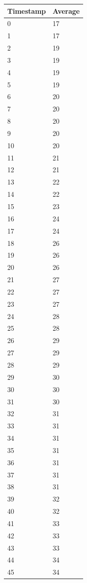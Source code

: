\begin{tabular}{|l||l|}
\hline
	\textbf{Timestamp} & \textbf{Average} \\ \hline
	0 & 17 \\ \hline
	1 & 17 \\ \hline
	2 & 19 \\ \hline
	3 & 19 \\ \hline
	4 & 19 \\ \hline
	5 & 19 \\ \hline
	6 & 20 \\ \hline
	7 & 20 \\ \hline
	8 & 20 \\ \hline
	9 & 20 \\ \hline
	10 & 20 \\ \hline
	11 & 21 \\ \hline
	12 & 21 \\ \hline
	13 & 22 \\ \hline
	14 & 22 \\ \hline
	15 & 23 \\ \hline
	16 & 24 \\ \hline
	17 & 24 \\ \hline
	18 & 26 \\ \hline
	19 & 26 \\ \hline
	20 & 26 \\ \hline
	21 & 27 \\ \hline
	22 & 27 \\ \hline
	23 & 27 \\ \hline
	24 & 28 \\ \hline
	25 & 28 \\ \hline
	26 & 29 \\ \hline
	27 & 29 \\ \hline
	28 & 29 \\ \hline
	29 & 30 \\ \hline
	30 & 30 \\ \hline
	31 & 30 \\ \hline
	32 & 31 \\ \hline
	33 & 31 \\ \hline
	34 & 31 \\ \hline
	35 & 31 \\ \hline
	36 & 31 \\ \hline
	37 & 31 \\ \hline
	38 & 31 \\ \hline
	39 & 32 \\ \hline
	40 & 32 \\ \hline
	41 & 33 \\ \hline
	42 & 33 \\ \hline
	43 & 33 \\ \hline
	44 & 34 \\ \hline
	45 & 34 \\ \hline
\end{tabular}
